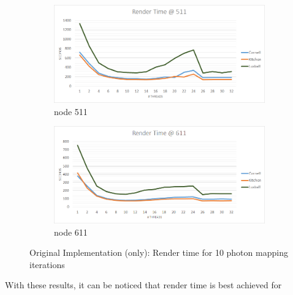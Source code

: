 \documentclass[main.tex]{subfiles}
\begin{document}
\begin{figure}[!htp]
  \centering
  \begin{subfigure}{.5\textwidth}
    \centering
    \includegraphics[width=\linewidth]{excel/rr_cpu_time_511}
    \caption{node 511 \label{fig:rr_cpu_time_511}}
  \end{subfigure}%
  \begin{subfigure}{.5\textwidth}
    \centering
    \includegraphics[width=\linewidth]{excel/rr_cpu_time_611}
    \caption{node 611 \label{fig:rr_cpu_time_611}}
  \end{subfigure}
  \caption{Original Implementation (\CPU only): Render time for 10 photon mapping iterations \label{fig:rr_cpu_time}}
\end{figure}


With these results, it can be noticed that render time is best achieved for
\end{document}
